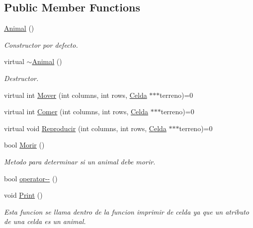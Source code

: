 \subsection*{Public Member Functions}
\begin{DoxyCompactItemize}
\item 
\hyperlink{classAnimal_a1e726a49ec952443190ac62dad22353c}{Animal} ()
\begin{DoxyCompactList}\small\item\em Constructor por defecto. \end{DoxyCompactList}\item 
virtual \hyperlink{classAnimal_a476af25adde5f0dfa688129c8f86fa5c}{$\sim$\+Animal} ()
\begin{DoxyCompactList}\small\item\em Destructor. \end{DoxyCompactList}\item 
virtual int \hyperlink{classAnimal_acfb4b1ab56fbd8d98b9ddc4070df6521}{Mover} (int columns, int rows, \hyperlink{classCelda}{Celda} $\ast$$\ast$$\ast$terreno)=0
\item 
virtual int \hyperlink{classAnimal_a4ce5ddb28b7784d6ff7293f312fb5d0a}{Comer} (int columns, int rows, \hyperlink{classCelda}{Celda} $\ast$$\ast$$\ast$terreno)=0
\item 
virtual void \hyperlink{classAnimal_aec115272cec5fc59c1a6944a0ad43fef}{Reproducir} (int columns, int rows, \hyperlink{classCelda}{Celda} $\ast$$\ast$$\ast$terreno)=0
\item 
bool \hyperlink{classAnimal_a016406215b6b52da9db042b956bcc3be}{Morir} ()
\begin{DoxyCompactList}\small\item\em Metodo para determinar si un animal debe morir. \end{DoxyCompactList}\item 
bool \hyperlink{classAnimal_a7c407c852d55806aa10b2db5844f683d}{operator-\/-\/} ()
\item 
void \hyperlink{classAnimal_aa03d8b2c76ee132f3347e7c1323d1473}{Print} ()
\begin{DoxyCompactList}\small\item\em Esta funcion se llama dentro de la funcion imprimir de celda ya que un atributo de una celda es un animal. \end{DoxyCompactList}\end{DoxyCompactItemize}
